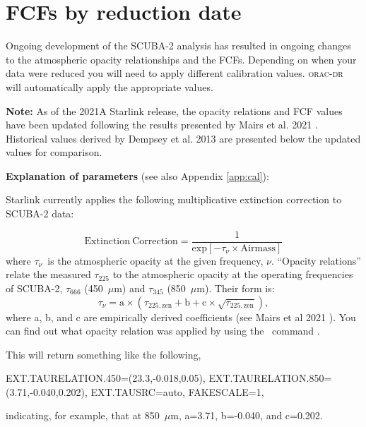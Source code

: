 \chapter{FCFs by reduction date}
\label{app:fcfs}

Ongoing development of the SCUBA-2 analysis has resulted in ongoing
changes to the atmospheric opacity relationships and the FCFs. 
Depending on when your data were reduced you will need to apply 
different calibration values. \textsc{orac-dr} will automatically apply
the appropriate values. 

\textbf{Note:} As of the 2021A Starlink release, the
opacity relations and FCF values have been updated following the
results presented by Mairs et al. 2021 \cite{mairs21}. Historical values derived by Dempsey et al. 2013
\cite{dempsey12} are presented below the updated values for comparison.

\vspace{1cm}

\textbf{Explanation of parameters} (see also Appendix \ref{app:cal}):

Starlink currently applies the following multiplicative extinction correction to SCUBA-2 data:

\begin{equation}
\mathrm{Extinction\:Correction} = \frac{1}{\mathrm{exp}[-\tau_{\nu}\times\mathrm{Airmass}]}
\end{equation}
where $\tau_{\nu}$ is the atmospheric opacity at the given frequency, $\nu$. ``Opacity relations''  
relate the measured $\tau_{225}$ to the atmospheric opacity at the operating frequencies of 
SCUBA-2, $\tau_{666}$ (450~$\mu$m) and $\tau_{345}$ (850~$\mu$m). Their form is:
\begin{equation}
\label{eq:2021taurelation}
\tau_{\nu} = \mathrm{a}\times(\tau_{225,\mathrm{zen}} + \mathrm{b} + \mathrm{c}\times\sqrt{\tau_{225,\mathrm{zen}}}),
\end{equation}
where a, b, and c are empirically derived coefficients (see Mairs et al 2021 \cite{mairs21}).
You can find out what opacity relation was applied by using the \Kappa\ command \hislist.

\begin{terminalv}
\end{terminalv}

This will return something like the following,
\begin{terminalv}
      EXT.TAURELATION.450=(23.3,-0.018,0.05),
      EXT.TAURELATION.850=(3.71,-0.040,0.202), EXT.TAUSRC=auto, FAKESCALE=1,
\end{terminalv}
indicating, for example, that at 850~$\mu$m, a=3.71, b=-0.040, and c=0.202.

